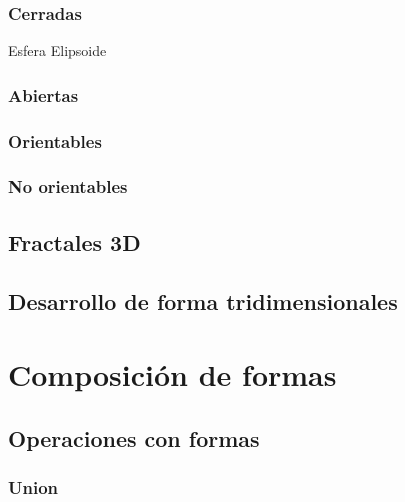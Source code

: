 \documentclass[16pt,]{krantz}
\theoremstyle{definition}
\theoremstyle{definition}
\theoremstyle{definition}
\theoremstyle{definition}
\theoremstyle{remark}
\begin{document}
\hypertarget{cerradas}{%
\subsection{Cerradas}\label{cerradas}}

Esfera Elipsoide

\hypertarget{abiertas}{%
\subsection{Abiertas}\label{abiertas}}

\hypertarget{orientables}{%
\subsection{Orientables}\label{orientables}}

\hypertarget{no-orientables}{%
\subsection{No orientables}\label{no-orientables}}

\hypertarget{fractales-3d}{%
\section{Fractales 3D}\label{fractales-3d}}

\hypertarget{desarrollo-de-forma-tridimensionales}{%
\section{Desarrollo de forma tridimensionales}\label{desarrollo-de-forma-tridimensionales}}

\hypertarget{composiciuxf3n-de-formas}{%
\chapter{Composición de formas}\label{composiciuxf3n-de-formas}}

\hypertarget{operaciones-con-formas}{%
\section{Operaciones con formas}\label{operaciones-con-formas}}

\hypertarget{union}{%
\subsection{Union}\label{union}}
\end{document}
